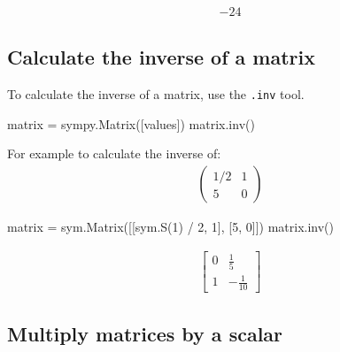 \begin{equation*}
\begin{split}\displaystyle -24\end{split}
\end{equation*}




\subsection{Calculate the inverse of a matrix}
\label{\detokenize{tools-for-mathematics/04-matrices/how/main:calculate-the-inverse-of-a-matrix}}

To calculate the inverse of a matrix, use the \texttt{.inv} tool.


\begin{pyin}
matrix = sympy.Matrix([values])
matrix.inv()
\end{pyin}



For example to
calculate the inverse of:
\begin{equation*}
\begin{split}
    \begin{pmatrix}
        1 / 2 & 1\\
        5     & 0
    \end{pmatrix}
\end{split}
\end{equation*}



\begin{pyin}
matrix = sym.Matrix([[sym.S(1) / 2, 1], [5, 0]])
matrix.inv()
\end{pyin}




\begin{equation*}
\begin{split}\displaystyle \left[\begin{matrix}0 & \frac{1}{5}\\1 & - \frac{1}{10}\end{matrix}\right]\end{split}
\end{equation*}




\subsection{Multiply matrices by a scalar}
\label{\detokenize{tools-for-mathematics/04-matrices/how/main:multiply-matrices-by-a-scalar}}

